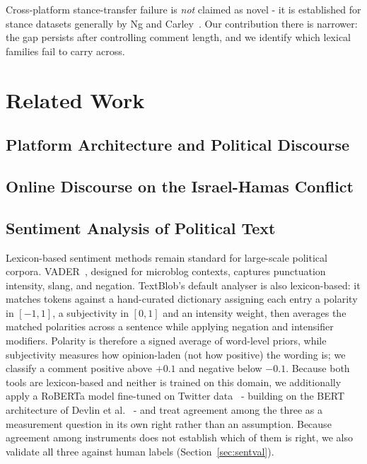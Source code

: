 \documentclass[10pt,twocolumn]{article}
\begin{document}
Cross-platform stance-transfer failure is \emph{not} claimed as novel - it is
established for stance datasets generally by Ng and Carley~\cite{ng2022}. Our
contribution there is narrower: the gap persists after controlling comment length,
and we identify which lexical families fail to carry across.

\section{Related Work}
\subsection{Platform Architecture and Political Discourse}


\subsection{Online Discourse on the Israel-Hamas Conflict}


\subsection{Sentiment Analysis of Political Text}
Lexicon-based sentiment methods remain standard for large-scale political corpora.
VADER~\cite{hutto2014}, designed for microblog contexts, captures punctuation
intensity, slang, and negation. TextBlob's default analyser is also lexicon-based:
it matches tokens against a hand-curated dictionary assigning each entry a polarity
in $[-1,1]$, a subjectivity in $[0,1]$ and an intensity weight, then averages the
matched polarities across a sentence while applying negation and intensifier
modifiers. Polarity is therefore a signed average of word-level priors, while
subjectivity measures how opinion-laden (not how positive) the wording is; we
classify a comment positive above $+0.1$ and negative below $-0.1$. Because both
tools are lexicon-based and neither is trained on this domain, we additionally apply
a RoBERTa model fine-tuned on Twitter data~\cite{loureiro2022} - building on the
BERT architecture of
Devlin et al.~\cite{devlin2019} - and treat agreement among the three as a
measurement question in its own right rather than an assumption. Because agreement
among instruments does not establish which of them is right, we also validate all
three against human labels (Section~\ref{sec:sentval}).
\end{document}
